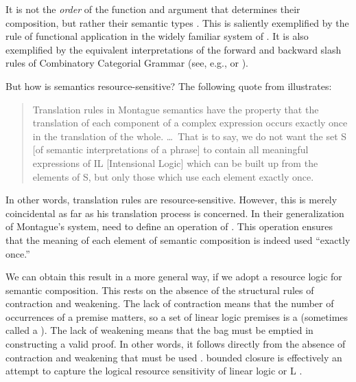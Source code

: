 \documentclass[output=paper,hidelinks]{langscibook}
\begin{document}
It is not the \emph{order} of the function and argument that determines their
composition, but rather their semantic types \citep{klein;sag85}. This
is saliently exemplified by the rule of functional application in the
widely familiar system of \citet[44,~95]{heim1998semantics}. It is also
exemplified by  the equivalent interpretations of the forward and backward slash
rules of Combinatory Categorial Grammar (see,
e.g., \citealt[406]{steedman87} or \citealt[186]{steedman;baldridge11}).

But how is semantics resource-sensitive? The following quote from
\citet[172]{klein;sag85} illustrates:
\begin{quote} 
  Translation rules in Montague semantics have the property that the
  translation of each component of a complex expression occurs exactly
  once in the translation of the whole. \ldots\ That is to say, we do not want
  the set S [of semantic interpretations of a phrase] to contain all
  meaningful expressions of IL [Intensional Logic] which can be built
  up from the elements of S, but only those which use each element
  exactly once.
\end{quote}  
%
In other words,  translation rules are
resource-sensitive. However, this is merely coincidental as far as his
translation process is concerned. In their generalization of Montague's
system, \citet[174]{klein;sag85} need to define an operation of
. This operation ensures that the meaning of
each element of semantic composition is indeed used ``exactly once.''

We can obtain this result in a more general way, if we adopt a resource
logic for semantic composition. This rests on the absence of the
structural rules of contraction and weakening. The lack of contraction
means that the number of occurrences of a premise matters, so a set of
linear logic premises is a  (sometimes called a
). The lack of weakening means that the bag must be emptied
in constructing a valid proof. In other words, it follows directly
from the absence of contraction and weakening that  must be used .  
 bounded closure is effectively an attempt
to capture the logical resource sensitivity of linear logic or L \citep[110--111]{Asudeh12}.
\end{document}

